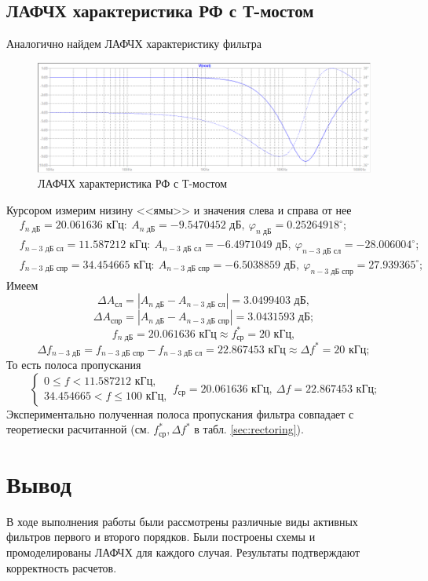\documentclass[a4paper, 12pt]{article}
\begin{document}
    \subsection{ЛАФЧХ характеристика РФ с Т-мостом}
    Аналогично найдем ЛАФЧХ характеристику фильтра
    \begin{figure}[H]
        \centering
        \includegraphics[scale=0.46]{5task_lapfr.png}
        \captionsetup{skip=0pt}
        \caption{ЛАФЧХ характеристика РФ с Т-мостом}
        \label{fig:5task_lapfr}
    \end{figure}
    \noindent Курсором измерим низину <<ямы>> и значения слева и справа от нее
    \begin{align*}
        &f_{n\text{ дБ}}=20.061636\text{ кГц}:\ A_{n\text{ дБ}}=-9.5470452\text{ дБ},\ \varphi_{n\text{ дБ}}=0.25264918^{\circ};\\
        &f_{n-3\text{ дБ сл}}=11.587212 \text{ кГц}:\ A_{n-3\text{ дБ сл}}=-6.4971049\text{ дБ},\ \varphi_{n-3\text{ дБ сл}}=-28.006004^{\circ};\\
        &f_{n-3\text{ дБ спр}}=34.454665 \text{ кГц}:\ A_{n-3\text{ дБ спр}}=-6.5038859\text{ дБ},\ \varphi_{n-3\text{ дБ спр}}=27.939365^{\circ};
    \end{align*}
    Имеем
    $$
    \Delta A_\text{сл}=|A_{n\text{ дБ}}-A_{n-3\text{ дБ сл}}|=3.0499403\text{ дБ},
    $$
    $$
    \Delta A_\text{спр}=|A_{n\text{ дБ}}-A_{n-3\text{ дБ спр}}|=3.0431593\text{ дБ};
    $$
    $$
    f_{n\text{ дБ}}=20.061636\text{ кГц}\approx f_\text{ср}^*=20\text{ кГц},
    $$
    $$
    \Delta f_{n-3\text{ дБ}}=f_{n-3\text{ дБ спр}}-f_{n-3\text{ дБ сл}}=22.867453\text{ кГц}\approx \Delta f^*=20\text{ кГц};
    $$
    То есть полоса пропускания
    $$
    \begin{cases}
        0\leq f<11.587212 \text{ кГц},\\
        34.454665<f\leq100\text{ кГц},
    \end{cases} f_\text{ср}=20.061636\text{ кГц},\ \Delta f=22.867453\text{ кГц};
    $$
    Экспериментально полученная полоса пропускания фильтра совпадает с теоретиески расчитанной (см. $f_\text{ср}^*,\Delta f^*$ в табл. \ref{sec:rectoring}).


    \section{Вывод}
    В ходе выполнения работы были рассмотрены различные виды
    активных фильтров первого и второго порядков. Были построены
    схемы и промоделированы ЛАФЧХ для каждого случая. Результаты
    подтверждают корректность расчетов.
\end{document}
